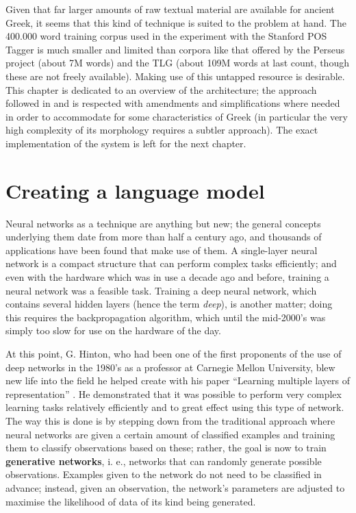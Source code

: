 Given that far larger amounts of raw textual material are available
for ancient Greek, it seems that this kind of technique is suited to
the problem at hand. The 400.000 word training corpus used in the
experiment with the Stanford POS Tagger is much smaller and limited
than corpora like that offered by the Perseus project (about 7M words)
and the TLG (about 109M words at last count, though these are not
freely available). Making use of this untapped resource is
desirable. This chapter is dedicated to an overview of the
architecture; the approach followed in \citet{collobert-2011} and
\citet{turian2010word} is respected with amendments and
simplifications where needed in order to accommodate for some
characteristics of Greek (in particular the very high complexity of
its morphology requires a subtler approach). The exact implementation
of the system is left for the next chapter.


\section{Creating a language model}
\label{sec:training-nn}

Neural networks as a technique are anything but new; the general
concepts underlying them date from more than half a century ago, and
thousands of applications have been found that make use of them. A
single-layer neural network is a compact structure that can perform
complex tasks efficiently; and even with the hardware which was in use
a decade ago and before, training a neural network was a feasible
task. Training a deep neural network, which contains several hidden
layers (hence the term \textit{deep}), is another matter; doing this
requires the backpropagation algorithm, which until the mid-2000's
was simply too slow for use on the hardware of the day. 

At this point, G. Hinton, who had been one of the first proponents of
the use of deep networks in the 1980's as a professor at Carnegie
Mellon University, blew new life into the field he helped create with
his paper ``Learning multiple layers of representation''
\citep{hinton2007learning}. He demonstrated that it was possible to
perform very complex learning tasks relatively efficiently and to
great effect using this type of network. The way this is done is by
stepping down from the traditional approach where neural networks are
given a certain amount of classified examples and training them to
classify observations based on these; rather, the goal is now to train
\textbf{generative networks}, i. e., networks that can randomly
generate possible observations. Examples given to the network do not
need to be classified in advance; instead, given an observation, the
network's parameters are adjusted to maximise the likelihood of data
of its kind being generated.

